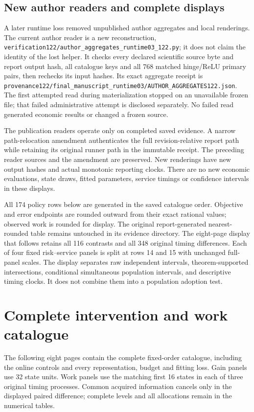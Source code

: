 \subsection{New author readers and complete displays}
A later runtime loss removed unpublished author aggregates and local
renderings. The current author reader is a new reconstruction,
\nolinkurl{verification122/author_aggregates_runtime03_122.py}; it does
not claim the identity of the lost helper. It checks every declared
scientific source byte and report output hash, all catalogue keys and
all 768 matched hinge/ReLU primary pairs, then rechecks its input hashes.
Its exact aggregate receipt is
\nolinkurl{provenance122/final_manuscript_runtime03/AUTHOR_AGGREGATES122.json}.
The first attempted read during materialization stopped on an unavailable
frozen file; that failed administrative attempt is disclosed separately.
No failed read generated economic results or changed a frozen source.

The publication readers operate only on completed saved evidence. A narrow
path-relocation amendment authenticates the full revision-relative report
path while retaining its original runner path in the immutable receipt.
The preceding reader sources and the amendment are preserved. New
renderings have new output hashes and actual monotonic reporting clocks.
There are no new economic evaluations, state draws, fitted parameters,
service timings or confidence intervals in these displays.

All 174 policy rows below are generated in the saved catalogue order.
Objective and error endpoints are rounded outward from their exact rational
values; observed work is rounded for display. The original report-generated
nearest-rounded table remains untouched in its evidence directory.
The eight-page display that follows retains all 116 contrasts and all 348
original timing differences. Each of four fixed risk--service panels is
split at rows 14 and 15 with unchanged full-panel scales. The display
separates raw independent intervals, theorem-supported intersections,
conditional simultaneous population intervals, and descriptive timing
clocks. It does not combine them into a population adoption test.


\section{Complete intervention and work catalogue}
\label{dev:catalogue122}
The following eight pages contain the complete fixed-order catalogue,
including the online controls and every representation, budget and fitting
loss. Gain panels use 32 state units. Work panels use the matching first
16 states in each of three original timing processes. Common acquired
information cancels only in the displayed paired difference; complete
levels and all allocations remain in the numerical tables.

